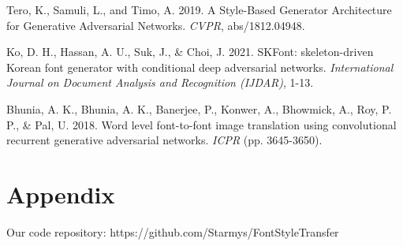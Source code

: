 \documentclass[letterpaper]{article}
\begin{document}
\smallskip \noindent
Tero, K., Samuli, L., and Timo, A. 2019. A Style-Based Generator Architecture for Generative Adversarial Networks. \textit{CVPR}, abs/1812.04948.

\smallskip \noindent
Ko, D. H., Hassan, A. U., Suk, J., \& Choi, J. 2021. SKFont: skeleton-driven Korean font generator with conditional deep adversarial networks. \textit{International Journal on Document Analysis and Recognition (IJDAR)}, 1-13.

\smallskip \noindent
Bhunia, A. K., Bhunia, A. K., Banerjee, P., Konwer, A., Bhowmick, A., Roy, P. P., \& Pal, U. 2018. Word level font-to-font image translation using convolutional recurrent generative adversarial networks. \textit{ICPR} (pp. 3645-3650).


\section{Appendix}
Our code repository: https://github.com/Starmys/FontStyleTransfer



\end{document}
